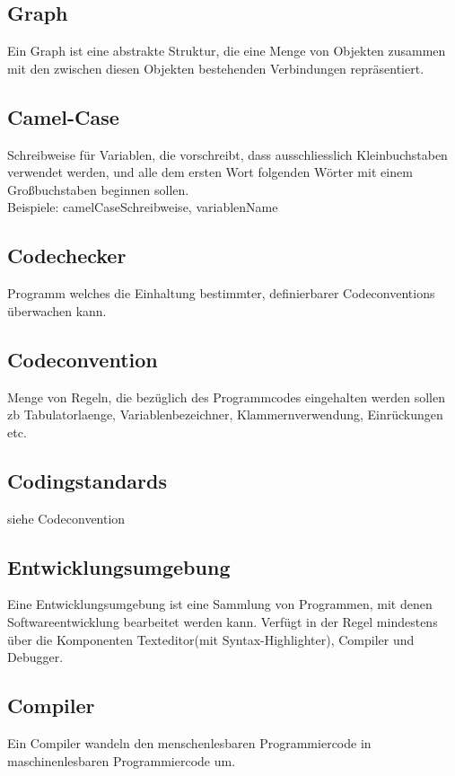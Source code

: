 \documentclass[11pt,a4paper]{article}
\begin{document}
\subsection{Graph}
Ein Graph ist eine abstrakte Struktur, die eine Menge von Objekten zusammen mit den zwischen diesen Objekten bestehenden Verbindungen repräsentiert.

\subsection{Camel-Case}
Schreibweise für Variablen, die vorschreibt, dass ausschliesslich Kleinbuchstaben verwendet werden, und alle dem ersten Wort folgenden Wörter mit einem Großbuchstaben beginnen sollen. \\
        Beispiele: camelCaseSchreibweise, variablenName

\subsection{Codechecker}
 Programm welches die Einhaltung bestimmter, definierbarer Codeconventions überwachen kann.

\subsection{Codeconvention}
Menge von Regeln, die bezüglich des Programmcodes eingehalten werden sollen zb Tabulatorlaenge, Variablenbezeichner, Klammernverwendung, Einrückungen etc.

\subsection{Codingstandards}
siehe Codeconvention

\subsection{Entwicklungsumgebung}
Eine Entwicklungsumgebung ist eine Sammlung von Programmen, mit denen Softwareentwicklung bearbeitet werden kann. Verfügt in der Regel mindestens über die Komponenten Texteditor(mit Syntax-Highlighter), Compiler und Debugger.

\subsection{Compiler}
Ein Compiler wandeln  den menschenlesbaren Programmiercode in maschinenlesbaren  Programmiercode um.
\end{document}
